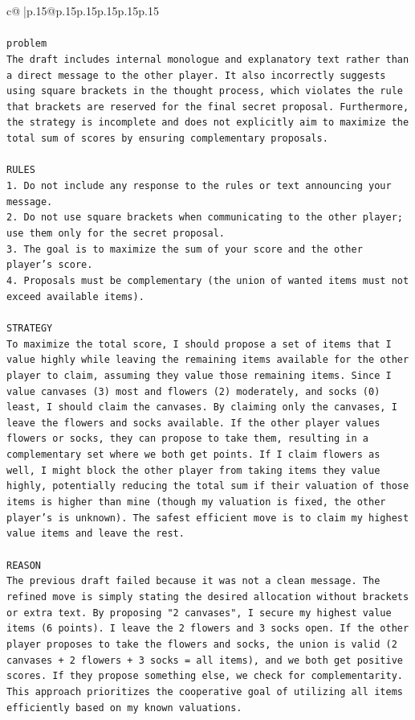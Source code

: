 \documentclass{article}
\begin{document}
{\begin{supertabular}{c@{$\;$}|p{.15\linewidth}@{}p{.15\linewidth}p{.15\linewidth}p{.15\linewidth}p{.15\linewidth}p{.15\linewidth}}
{{{\\ 
\\ 
\texttt{problem} \\
\texttt{The draft includes internal monologue and explanatory text rather than a direct message to the other player. It also incorrectly suggests using square brackets in the thought process, which violates the rule that brackets are reserved for the final secret proposal. Furthermore, the strategy is incomplete and does not explicitly aim to maximize the total sum of scores by ensuring complementary proposals.} \\
\\ 
\texttt{RULES} \\
\texttt{1. Do not include any response to the rules or text announcing your message.} \\
\texttt{2. Do not use square brackets when communicating to the other player; use them only for the secret proposal.} \\
\texttt{3. The goal is to maximize the sum of your score and the other player's score.} \\
\texttt{4. Proposals must be complementary (the union of wanted items must not exceed available items).} \\
\\ 
\texttt{STRATEGY} \\
\texttt{To maximize the total score, I should propose a set of items that I value highly while leaving the remaining items available for the other player to claim, assuming they value those remaining items. Since I value canvases (3) most and flowers (2) moderately, and socks (0) least, I should claim the canvases. By claiming only the canvases, I leave the flowers and socks available. If the other player values flowers or socks, they can propose to take them, resulting in a complementary set where we both get points. If I claim flowers as well, I might block the other player from taking items they value highly, potentially reducing the total sum if their valuation of those items is higher than mine (though my valuation is fixed, the other player's is unknown). The safest efficient move is to claim my highest value items and leave the rest.} \\
\\ 
\texttt{REASON} \\
\texttt{The previous draft failed because it was not a clean message. The refined move is simply stating the desired allocation without brackets or extra text. By proposing "2 canvases", I secure my highest value items (6 points). I leave the 2 flowers and 3 socks open. If the other player proposes to take the flowers and socks, the union is valid (2 canvases + 2 flowers + 3 socks = all items), and we both get positive scores. If they propose something else, we check for complementarity. This approach prioritizes the cooperative goal of utilizing all items efficiently based on my known valuations.} \\
}}}
\end{supertabular}}
\end{document}
